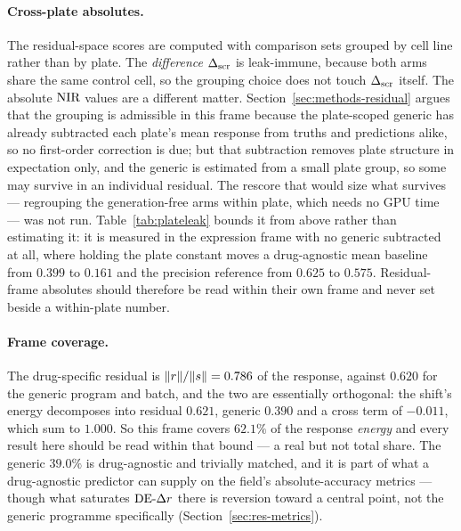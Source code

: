 \paragraph{Cross-plate absolutes.} The residual-space scores are computed with comparison sets
grouped by cell line rather than by plate. The \emph{difference} $\Delta_{\textrm{scr}}$ is leak-immune, because both
arms share the same control cell, so the grouping choice does not touch $\Delta_{\textrm{scr}}$ itself. The absolute $\textrm{NIR}$ values are a different matter.
Section~\ref{sec:methods-residual} argues that the grouping is admissible in this frame because the
plate-scoped generic has already subtracted each plate's mean response from truths and predictions
alike, so no first-order correction is due; but that subtraction removes plate structure in
expectation only, and the generic is estimated from a small plate group, so some may survive in an
individual residual. The rescore that would size what survives --- regrouping the generation-free
arms within plate, which needs no GPU time --- was not run. Table~\ref{tab:plateleak} bounds it from
above rather than estimating it: it is measured in the expression frame with no generic subtracted at
all, where holding the plate constant moves a drug-agnostic mean baseline from $0.399$ to $0.161$ and
the precision reference from $0.625$ to $0.575$. Residual-frame absolutes should therefore be read within their own frame and
never set beside a within-plate number.

\paragraph{Frame coverage.} The drug-specific residual is $\lVert r\rVert/\lVert s\rVert =
0.786$ of the response, against $0.620$ for the generic program and batch, and the two are
essentially orthogonal: the shift's energy decomposes into residual $0.621$, generic $0.390$ and a
cross term of $-0.011$, which sum to $1.000$. So this frame covers $62.1\%$ of the response
\emph{energy} and every result here should be read within that bound --- a real but not total
share. The generic $39.0\%$ is drug-agnostic and trivially matched, and it is part of what a drug-agnostic
predictor can supply on the field's absolute-accuracy metrics --- though what saturates $\textrm{DE-}\Delta r$
there is reversion toward a central point, not the generic programme specifically
(Section~\ref{sec:res-metrics}).

